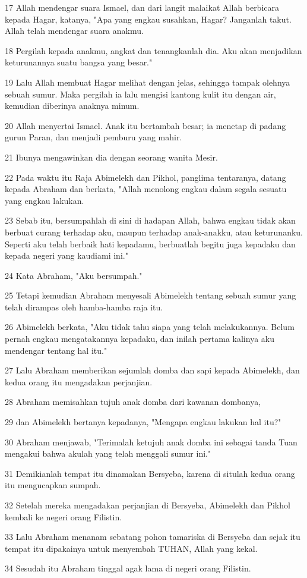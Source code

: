 \par 17 Allah mendengar suara Ismael, dan dari langit malaikat Allah berbicara kepada Hagar, katanya, "Apa yang engkau susahkan, Hagar? Janganlah takut. Allah telah mendengar suara anakmu.
\par 18 Pergilah kepada anakmu, angkat dan tenangkanlah dia. Aku akan menjadikan keturunannya suatu bangsa yang besar."
\par 19 Lalu Allah membuat Hagar melihat dengan jelas, sehingga tampak olehnya sebuah sumur. Maka pergilah ia lalu mengisi kantong kulit itu dengan air, kemudian diberinya anaknya minum.
\par 20 Allah menyertai Ismael. Anak itu bertambah besar; ia menetap di padang gurun Paran, dan menjadi pemburu yang mahir.
\par 21 Ibunya mengawinkan dia dengan seorang wanita Mesir.
\par 22 Pada waktu itu Raja Abimelekh dan Pikhol, panglima tentaranya, datang kepada Abraham dan berkata, "Allah menolong engkau dalam segala sesuatu yang engkau lakukan.
\par 23 Sebab itu, bersumpahlah di sini di hadapan Allah, bahwa engkau tidak akan berbuat curang terhadap aku, maupun terhadap anak-anakku, atau keturunanku. Seperti aku telah berbaik hati kepadamu, berbuatlah begitu juga kepadaku dan kepada negeri yang kaudiami ini."
\par 24 Kata Abraham, "Aku bersumpah."
\par 25 Tetapi kemudian Abraham menyesali Abimelekh tentang sebuah sumur yang telah dirampas oleh hamba-hamba raja itu.
\par 26 Abimelekh berkata, "Aku tidak tahu siapa yang telah melakukannya. Belum pernah engkau mengatakannya kepadaku, dan inilah pertama kalinya aku mendengar tentang hal itu."
\par 27 Lalu Abraham memberikan sejumlah domba dan sapi kepada Abimelekh, dan kedua orang itu mengadakan perjanjian.
\par 28 Abraham memisahkan tujuh anak domba dari kawanan dombanya,
\par 29 dan Abimelekh bertanya kepadanya, "Mengapa engkau lakukan hal itu?"
\par 30 Abraham menjawab, "Terimalah ketujuh anak domba ini sebagai tanda Tuan mengakui bahwa akulah yang telah menggali sumur ini."
\par 31 Demikianlah tempat itu dinamakan Bersyeba, karena di situlah kedua orang itu mengucapkan sumpah.
\par 32 Setelah mereka mengadakan perjanjian di Bersyeba, Abimelekh dan Pikhol kembali ke negeri orang Filistin.
\par 33 Lalu Abraham menanam sebatang pohon tamariska di Bersyeba dan sejak itu tempat itu dipakainya untuk menyembah TUHAN, Allah yang kekal.
\par 34 Sesudah itu Abraham tinggal agak lama di negeri orang Filistin.


